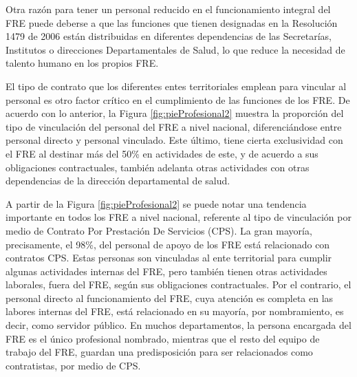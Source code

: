 \documentclass[
  oneside]{book}
\begin{document}
Otra razón para tener un personal reducido en el funcionamiento integral del FRE puede deberse a que las funciones que tienen designadas en la Resolución 1479 de 2006 están distribuidas en diferentes dependencias de las Secretarías, Institutos o direcciones Departamentales de Salud, lo que reduce la necesidad de talento humano en los propios FRE.

El tipo de contrato que los diferentes entes territoriales emplean para vincular al personal es otro factor crítico en el cumplimiento de las funciones de los FRE. De acuerdo con lo anterior, la Figura \ref{fig:pieProfesional2} muestra la proporción del tipo de vinculación del personal del FRE a nivel nacional, diferenciándose entre personal directo y personal vinculado. Este último, tiene cierta exclusividad con el FRE al destinar más del 50\% en actividades de este, y de acuerdo a sus obligaciones contractuales, también adelanta otras actividades con otras dependencias de la dirección departamental de salud.

A partir de la Figura \ref{fig:pieProfesional2} se puede notar una tendencia importante en todos los FRE a nivel nacional, referente al tipo de vinculación por medio de Contrato Por Prestación De Servicios (CPS). La gran mayoría, precisamente, el 98\%, del personal de apoyo de los FRE está relacionado con contratos CPS. Estas personas son vinculadas al ente territorial para cumplir algunas actividades internas del FRE, pero también tienen otras actividades laborales, fuera del FRE, según sus obligaciones contractuales. Por el contrario, el personal directo al funcionamiento del FRE, cuya atención es completa en las labores internas del FRE, está relacionado en su mayoría, por nombramiento, es decir, como servidor público. En muchos departamentos, la persona encargada del FRE es el único profesional nombrado, mientras que el resto del equipo de trabajo del FRE, guardan una predisposición para ser relacionados como contratistas, por medio de CPS.
\end{document}
